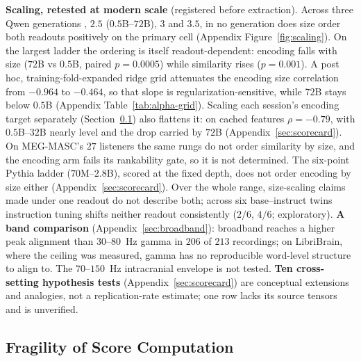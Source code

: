 \documentclass{article}
\begin{document}
\textbf{Scaling, retested at modern scale} (registered before extraction). Across three Qwen
generations \citep{qwen2024qwen25, yang2025qwen3, qwen2026qwen35}, $2.5$ ($0.5$B--$72$B), $3$ and $3.5$, in no generation does size order
both readouts positively on the primary cell (Appendix Figure~\ref{fig:scaling}). On the
largest ladder the ordering is itself readout-dependent: encoding falls with size ($72$B vs
$0.5$B, paired $p=0.0005$) while similarity rises ($p=0.001$). A post hoc, training-fold-expanded
ridge grid attenuates the encoding size correlation from $-0.964$ to $-0.464$, so that slope is
regularization-sensitive, while $72$B stays below $0.5$B (Appendix Table~\ref{tab:alpha-grid}). Scaling each
session's encoding target separately (Section~\ref{sec:fragility}) also flattens it: on cached features
$\rho=-0.79$, with $0.5$B--$32$B nearly level and the drop carried by $72$B (Appendix~\ref{sec:scorecard}). On
MEG-MASC's $27$ listeners the same rungs do not order similarity by size, and the encoding arm fails
its rankability gate, so it is not determined. The six-point Pythia ladder ($70$M--$2.8$B), scored
at the fixed depth, does not order encoding by size either (Appendix~\ref{sec:scorecard}). Over the
whole range, size-scaling claims made under
one readout \citep{antonello2024scaling, hong2026larger} do not describe both; across six
base--instruct twins instruction tuning shifts neither readout consistently ($2/6$, $4/6$;
exploratory). \textbf{A band comparison} (Appendix~\ref{sec:broadband}): broadband reaches a higher peak
alignment than $30$--$80$~Hz gamma in $206$ of $213$ recordings; on LibriBrain, where the ceiling
was measured, gamma has no reproducible word-level structure to align to. The $70$--$150$~Hz
intracranial envelope is not tested.
\textbf{Ten cross-setting hypothesis tests} (Appendix~\ref{sec:scorecard}) are conceptual extensions
and analogies, not a replication-rate estimate; one row lacks its source tensors and is unverified.

\subsection{Fragility of Score Computation}\label{sec:fragility}
\end{document}
